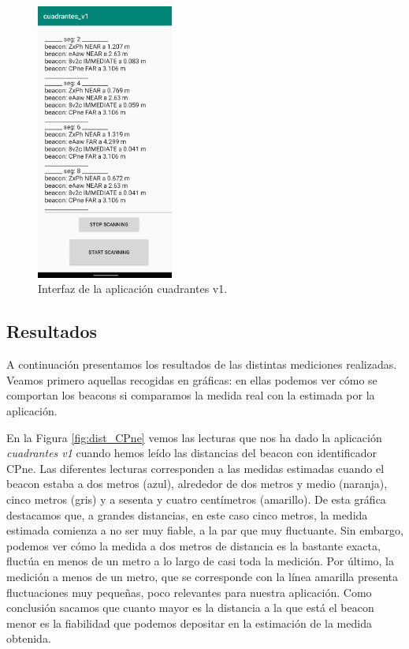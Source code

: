 \begin{figure}[t]
	\centering
	\includegraphics[width=0.4\textwidth]{Imagenes/Descripciondeltrabajo/cuadrantes_v1}
	\caption{Interfaz de la aplicación cuadrantes v1.}
	\label{fig:cuadrantesv1}
\end{figure}


\subsection{Resultados}

A continuación presentamos los resultados de las distintas mediciones realizadas. Veamos primero  aquellas recogidas en gráficas: en ellas podemos ver cómo se comportan los beacons si comparamos la medida real con la estimada por la aplicación. 

En la Figura \ref{fig:dist_CPne} vemos las lecturas que nos ha dado la aplicación \textit{cuadrantes v1} cuando hemos leído las distancias del beacon con identificador CPne. Las diferentes lecturas corresponden a las medidas estimadas cuando el beacon estaba a dos metros (azul), alrededor de dos metros y medio (naranja), cinco metros (gris) y a sesenta y cuatro centímetros (amarillo). De esta gráfica destacamos que, a grandes distancias, en este caso cinco metros, la medida estimada comienza a no ser muy fiable, a la par que muy fluctuante. Sin embargo, podemos ver cómo la medida a dos metros de distancia es la bastante exacta, fluctúa en menos de un metro a lo largo de casi toda la medición. Por último, la medición a menos de un metro, que se corresponde con la línea amarilla presenta fluctuaciones muy pequeñas, poco relevantes para nuestra aplicación. Como conclusión sacamos que cuanto mayor es la distancia a la que está el beacon menor es la fiabilidad  que podemos depositar en la estimación de la medida obtenida. 

